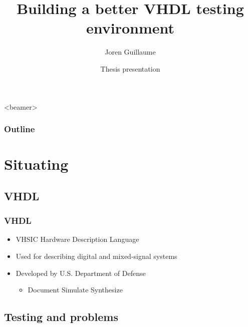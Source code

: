 \documentclass[british,10pt]{beamer}
\title{Building a better VHDL testing environment}
\author[J. Guillaume]{Joren Guillaume}
\date[JAN'15, Gent]{Thesis presentation}
\institute[Ghent University]
{
  FEA\\
  Ghent University
}
\begin{document}
\begin{frame}[plain]
  \titlepage
\end{frame}



\begin{frame}<beamer>\frametitle{Outline}
  \tableofcontents
\end{frame}

\section{Situating}
\subsection{VHDL}
\begin{frame}\frametitle{VHDL}
\begin{itemize}
\item VHSIC Hardware Description Language
\item Used for describing digital and mixed-signal systems 
\item Developed by U.S. Department of Defense
\begin{itemize}
\item Document  Simulate  Synthesize
\end{itemize}
\end{itemize}
\end{frame}

\subsection{Testing and problems}
\end{document}

